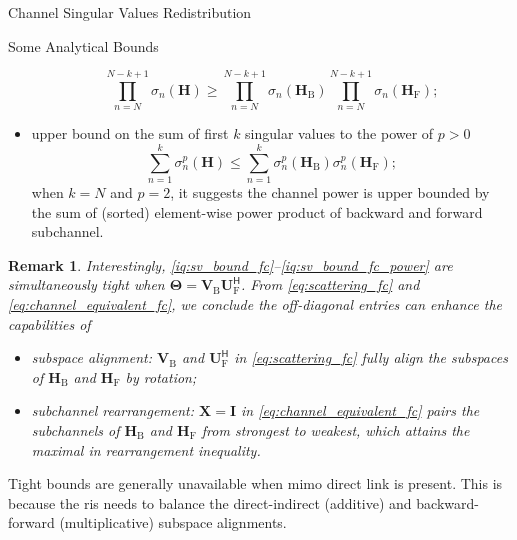 \documentclass[journal]{IEEEtran}
\newtheorem{remark}{Remark}
\begin{document}
\begin{section}{Channel Singular Values Redistribution}
\begin{subsection}{Some Analytical Bounds}
\begin{itemize}
			\begin{equation}
				\prod_{n=N}^{N-k+1} \sigma_n(\mathbf{H}) \ge \prod_{n=N}^{N-k+1} \sigma_n(\mathbf{H}_\mathrm{B}) \prod_{n=N}^{N-k+1} \sigma_n(\mathbf{H}_\mathrm{F});
			\end{equation}
			\item upper bound on the sum of first $k$ singular values to the power of $p > 0$
			\begin{equation}
				\sum_{n=1}^k \sigma_n^p(\mathbf{H}) \le \sum_{n=1}^k \sigma_n^p(\mathbf{H}_\mathrm{B}) \sigma_n^p(\mathbf{H}_\mathrm{F});
				\label{iq:sv_bound_fc_power}
			\end{equation}
			when $k = N$ and $p = 2$, it suggests the channel power is upper bounded by the sum of (sorted) element-wise power product of backward and forward subchannel.
		\end{itemize}

		\begin{remark}
			Interestingly, \eqref{iq:sv_bound_fc}--\eqref{iq:sv_bound_fc_power} are simultaneously tight when $\mathbf{\Theta} = \mathbf{V}_\mathrm{B} \mathbf{U}_\mathrm{F}^\mathsf{H}$.
			From \eqref{eq:scattering_fc} and \eqref{eq:channel_equivalent_fc}, we conclude the off-diagonal entries can enhance the capabilities of
			\begin{itemize}
				\item subspace alignment: $\mathbf{V}_\mathrm{B}$ and $\mathbf{U}_\mathrm{F}^\mathsf{H}$ in \eqref{eq:scattering_fc} fully align the subspaces of $\mathbf{H}_\mathrm{B}$ and $\mathbf{H}_\mathrm{F}$ by rotation;
				\item subchannel rearrangement: $\mathbf{X} = \mathbf{I}$ in \eqref{eq:channel_equivalent_fc} pairs the subchannels of $\mathbf{H}_\mathrm{B}$ and $\mathbf{H}_\mathrm{F}$ from strongest to weakest, which attains the maximal in rearrangement inequality.
			\end{itemize}
		\end{remark}

		Tight bounds are generally unavailable when \gls{mimo} direct link is present.
		This is because the \gls{ris} needs to balance the direct-indirect (additive) and backward-forward (multiplicative) subspace alignments.
	\end{subsection}

\end{section}
\end{document}
